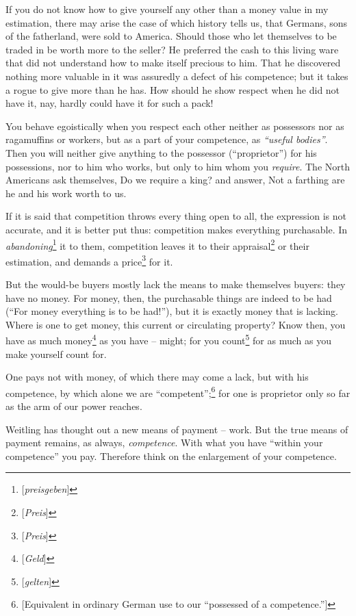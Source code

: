 \documentclass[12pt,a4paper]{book}
\begin{document}
If you do not know how to give yourself any other than a money value in my 
estimation, there may arise the case of which history tells us, that Germans, 
sons of the fatherland, were sold to America. Should those who let themselves 
to be traded in be worth more to the seller? He preferred the cash to this 
living ware that did not understand how to make itself precious to him. That 
he discovered nothing more valuable in it was assuredly a defect of his 
competence; but it takes a rogue to give more than he has. How should he show 
respect when he did not have it, nay, hardly could have it for such a pack!

You behave egoistically when you respect each other neither as possessors nor 
as ragamuffins or workers, but as a part of your competence, as 
\textit{``useful bodies''}. Then you will neither give anything to the 
possessor (``proprietor'') for his possessions, nor to him who works, but 
only to him whom you \textit{require}. The North Americans ask themselves, Do 
we require a king? and answer, Not a farthing are he and his work worth to us.

If it is said that competition throws every thing open to all, the expression 
is not accurate, and it is better put thus: competition makes everything 
purchasable. In \textit{abandoning}\footnote{[\textit{preisgeben}]} it to 
them, competition leaves it to their appraisal\footnote{[\textit{Preis}]} or 
their estimation, and demands a price\footnote{[\textit{Preis}]} for it.

But the would-be buyers mostly lack the means to make themselves buyers: they 
have no money. For money, then, the purchasable things are indeed to be had 
(``For money everything is to be had!''), but it is exactly money that is 
lacking. Where is one to get money, this current or circulating property? Know 
then, you have as much money\footnote{[\textit{Geld}]} as you have -- might; 
for you count\footnote{[\textit{gelten}]} for as much as you make yourself 
count for.

One pays not with money, of which there may come a lack, but with his 
competence, by which alone we are ``competent'';\footnote{[Equivalent in 
ordinary German use to our ``possessed of a competence.'']} for one is 
proprietor only so far as the arm of our power reaches.

Weitling has thought out a new means of payment -- work. But the true means of 
payment remains, as always, \textit{competence}. With what you have ``within 
your competence'' you pay. Therefore think on the enlargement of your 
competence.
\end{document}
